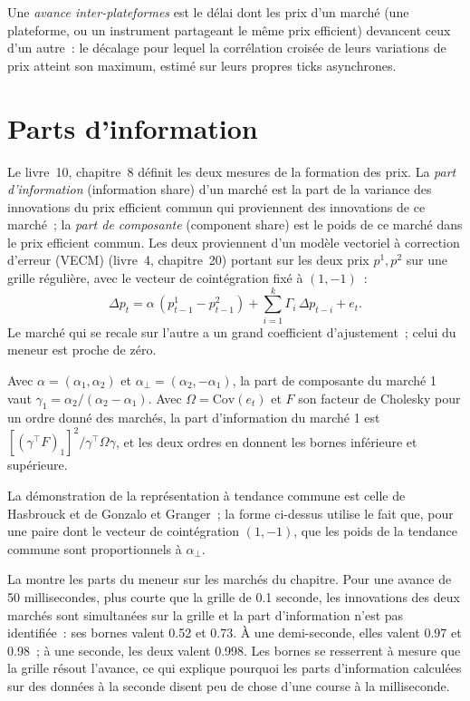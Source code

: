 \begin{definition}\label{def:hf:lead-lag-and-cross-venue-trading:lead}
Une \emph{avance inter-plateformes} est le délai dont les prix d'un marché (une plateforme, ou un instrument partageant le même
prix efficient) devancent ceux d'un autre~: le décalage pour lequel la corrélation croisée de leurs variations de prix atteint son maximum, estimé sur leurs propres
ticks asynchrones.
\end{definition}

\section{Parts d'information}

Le livre~10, chapitre~8 définit les deux mesures de la formation des prix. La \emph{part d'information} (information share) d'un marché est la part de la variance des
innovations du prix efficient commun qui proviennent des innovations de ce marché~; la \emph{part de composante} (component share) est le poids de ce marché dans le
prix efficient commun. Les deux proviennent d'un modèle vectoriel à correction d'erreur (VECM) (livre~4, chapitre~20) portant sur les deux prix $p^1,p^2$ sur une grille régulière,
avec le vecteur de cointégration fixé à $(1,-1)$~:
\[
\Delta p_t=\alpha\,(p^1_{t-1}-p^2_{t-1})+\sum_{i=1}^{k}\Gamma_i\,\Delta p_{t-i}+e_t .
\]
Le marché qui se recale sur l'autre a un grand coefficient d'ajustement~; celui du meneur est proche de zéro.

\begin{proposition}\label{prop:hf:lead-lag-and-cross-venue-trading:shares}
Avec $\alpha=(\alpha_1,\alpha_2)$ et $\alpha_\perp=(\alpha_2,-\alpha_1)$, la part de composante du marché 1 vaut $\gamma_1=\alpha_2/(\alpha_2-\alpha_1)$. Avec
$\Omega=\mathrm{Cov}(e_t)$ et $F$ son facteur de Cholesky pour un ordre donné des marchés, la part d'information du marché 1 est
$[(\gamma^\top F)_1]^2/\gamma^\top\Omega\gamma$, et les deux ordres en donnent les bornes inférieure et supérieure.
\end{proposition}

\admitted
La démonstration de la représentation à tendance commune est celle de Hasbrouck et de Gonzalo et Granger~; la forme ci-dessus utilise le fait que, pour une paire dont
le vecteur de cointégration $(1,-1)$, que les poids de la tendance commune sont proportionnels à $\alpha_\perp$.

La  montre les parts du meneur sur les marchés du chapitre. Pour une avance de 50 millisecondes, plus courte
que la grille de 0.1 seconde, les innovations des deux marchés sont simultanées sur la grille et la part d'information n'est pas identifiée~: ses bornes valent
0.52 et 0.73. À une demi-seconde, elles valent 0.97 et 0.98~; à une seconde, les deux valent 0.998. Les bornes se resserrent à mesure que la grille résout l'avance, ce qui explique
pourquoi les parts d'information calculées sur des données à la seconde disent peu de chose d'une course à la milliseconde.

